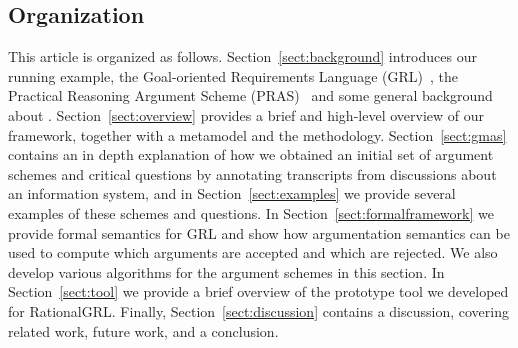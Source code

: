 \subsection{Organization} %

This article is organized as follows. Section~\ref{sect:background} introduces our running example, the Goal-oriented Requirements Language (GRL)~\cite{Amyot:2010:EGM:1841349.1841356}, the Practical Reasoning Argument Scheme (PRAS)~\cite{atkinson2007} and some general background about . Section~\ref{sect:overview} provides a brief and high-level overview of our framework, together with a metamodel and the methodology. Section~\ref{sect:gmas} contains an in depth explanation of how we obtained an initial set of argument schemes and critical questions by annotating transcripts from discussions about an information system, and in Section~\ref{sect:examples} we provide several examples of these schemes and questions. In Section~\ref{sect:formalframework} we provide formal semantics for GRL and show how argumentation semantics \cite{dung1995} can be used to compute which arguments are accepted and which are rejected. We also develop various algorithms for the argument schemes in this section. In Section~\ref{sect:tool} we provide a brief overview of the prototype tool we developed for RationalGRL. Finally, Section~\ref{sect:discussion} contains a discussion, covering related work, future work, and a conclusion.
